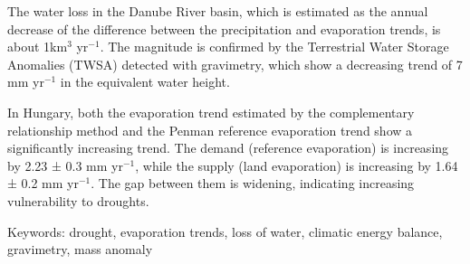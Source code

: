 The water loss in the Danube River basin, which is estimated as the annual decrease of the difference between the precipitation and evaporation trends, is about 1km$^3$ yr$^{-1}$. The magnitude is confirmed by the Terrestrial Water Storage Anomalies (TWSA) detected with gravimetry, which show a decreasing trend of 7 mm yr$^{-1}$ in the equivalent water height.

In Hungary, both the evaporation trend estimated by the complementary relationship method and the Penman reference evaporation trend show a significantly increasing trend. The demand (reference evaporation) is increasing by 2.23 ± 0.3 mm yr$^{-1}$, while the supply (land evaporation) is increasing by 1.64 ± 0.2 mm yr$^{-1}$. The gap between them is widening, indicating increasing vulnerability to droughts.

Keywords:
drought, evaporation trends, loss of water, climatic energy balance, gravimetry, mass anomaly
\newpage{}
{}
\begin{flushleft}





\end{flushleft}

\noindent

